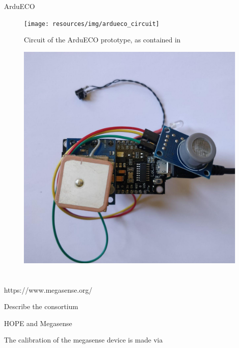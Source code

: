 ArduECO

\begin{figure}
	\centering
	\texttt{[image: resources/img/ardueco\_circuit]}
	\caption{Circuit of the ArduECO prototype, as contained in \cite{ardueco_paper}}
\end{figure}

\begin{figure}
	\centering
	\includegraphics[width=.5\textwidth]{resources/img/ardueco_picture}
	\caption{}
\end{figure}

\section{\megasense}\label{sec:megasense}


https://www.megasense.org/

Describe the consortium

HOPE and Megasense

The calibration of the megasense device is made via